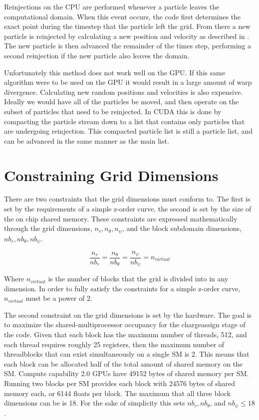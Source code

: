 Reinjections on the CPU are performed whenever a particle leaves the computational domain. When this event occurs, the code first determines the exact point during the timestep that the particle left the grid. From there a new particle is reinjected by calculating a new position and velocity as described in \cite{Patacchini2007}. The new particle is then advanced the remainder of the times step, performing a second reinjection if the new particle also leaves the domain. 

Unfortunately this method does not work well on the GPU. If this same algorithm were to be used on the GPU it would result in a large amount of warp divergence. Calculating new random positions and velocities is also expensive. Ideally we would have all of the particles be moved, and then operate on the subset of particles that need to be reinjected. In CUDA this is done by compacting the particle stream down to a list that contains only particles that are undergoing reinjection. This compacted particle list is still a particle list, and can be advanced in the same manner as the main list.  

	\section{Constraining Grid Dimensions}
	\label{sec:grid_constraincts}
There are two constraints that the grid dimensions must conform to. The first is set by the requirements of a simple z-order curve, the second is set by the size of the on chip shared memory. These constraints are expressed mathematically through the grid dimensions, $n_r, n_{\theta}, n_{\psi}$, and the block subdomain dimensions, $nb_r, nb_{\theta}, nb_{\psi}$.
		
\begin{equation}
\frac{n_r}{nb_r} = \frac{n_{\theta}}{nb_{\theta}} = \frac{n_{\psi}}{nb_{\psi}} = n_{virtual}
\end{equation} 

Where $n_{virtual}$ is the number of blocks that the grid is divided into in any dimension. In order to fully satisfy the constraints for a simple z-order curve, $n_{virtual}$ must be a power of 2.

The second constraint on the grid dimensions is set by the hardware. The goal is to maximize the shared-multiprocessor occupancy for the chargeassign stage of the code. Given that each block has the maximum number of threads, 512, and each thread requires roughly 25 registers, then the maximum number of threadblocks that can exist simultaneously on a single SM is 2. This means that each block can be allocated half of the total amount of shared memory on the SM. Compute capability 2.0 GPUs have 49152 bytes of shared memory per SM. Running two blocks per SM provides each block with 24576 bytes of shared memory each, or 6144 floats per block. The maximum that all three block dimensions can be is 18. For the sake of simplicity this sets $nb_r, nb_{\theta}$, and $nb_{\psi} \le 18$. 

